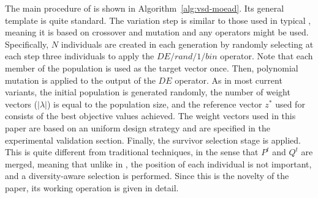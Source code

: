 The main procedure of \AVSDMOEAD{} is shown in Algorithm~\ref{alg:vsd-moead}.
%
Its general template is quite standard.
%
The variation step is similar to those used in typical \MOEAS{}, meaning
it is based on crossover and mutation and any operators might be used.
%
Specifically, $N$ individuals are created in each generation by randomly selecting at each step three individuals
to apply the $DE/rand/1/bin$ operator.
%
Note that each member of the population is used as the target vector once.
%
Then, polynomial mutation is applied to the output of the $DE$ operator.
%
As in most current \MOEAD{} variants, the initial population is generated randomly,
the number of weight vectors ($|\lambda|$) is equal to the population size,
and the reference vector $z^*$ used for \ASF{} consists of the best 
objective values achieved.
%
The weight vectors used in this paper are based on an uniform design strategy and are
specified in the experimental validation section.
%
Finally, the survivor selection stage is applied.
%
This is quite different from traditional techniques, in the sense that $P^t$ and $Q^t$ are merged, meaning
that unlike in \MOEAD{}, the position of each individual is not important, and a diversity-aware
selection is performed.
%
Since this is the novelty of the paper, its working operation is given in detail.

